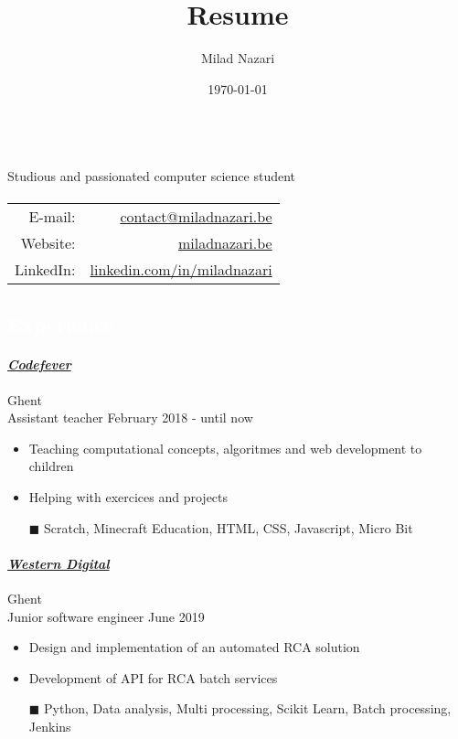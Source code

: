 \documentclass[a4paper, twoside]{article}
\title{Resume}
\author{ Milad Nazari }
\date{\today}
\begin{document}
\begin{multicols}{2}
\\
\noindent Studious and passionated computer science student
\paragraph{}
{\small
\hfill
\begin{tabular}{rr}
\textcolor{blueDark}{E-mail:} & \href{ mailto:contact@miladnazari.be }{ contact@miladnazari.be } \\
\textcolor{blueDark}{Website:} & \href{ https://miladnazari.be }{ miladnazari.be } \\
\textcolor{blueDark}{LinkedIn}: & \href{ https://linkedin.com/in/miladnazari }{ linkedin.com/in/miladnazari }
\end{tabular}
}
\end{multicols}
\begin{mdframed}
\section*{\textcolor{white}{ Experience }}
\end{mdframed}
\paragraph{\textbf{\textit{\href{https://codefever.be }{\textcolor{blueDark}{ Codefever }}}}} \hfill\small Ghent \\
Assistant teacher \hfill\small
February 2018
- until now
\begin{itemize}
\itemsep-0.2em
\item Teaching computational concepts, algoritmes and web development to children
\item Helping with exercices and projects
\item[\color{orange}$\blacksquare$] Scratch, Minecraft Education, HTML, CSS, Javascript, Micro Bit
\end{itemize}
\paragraph{\textbf{\textit{\href{https://westerndigital.com }{\textcolor{blueDark}{ Western Digital }}}}} \hfill\small Ghent \\
Junior software engineer \hfill\small
June 2019
\begin{itemize}
\itemsep-0.2em
\item Design and implementation of an automated RCA solution
\item Development of API for RCA batch services
\item[\color{orange}$\blacksquare$] Python, Data analysis, Multi processing, Scikit Learn, Batch processing, Jenkins
\end{itemize}
\end{document}
